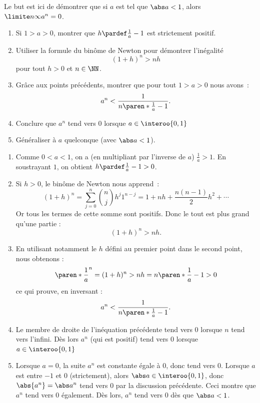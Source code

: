 \documentclass[12pt,french,oneside,a4paper]{memoir} %
\begin{document}
\begin{exo}
Le but est ici de démontrer que si $a$ est tel que $\abs a < 1$, alors $\limite n \infty a^{n} = 0$. 
\begin{enumerate}
\item Si $1 > a > 0$, montrer que $h \pardef \frac{1}{a} - 1$ est strictement positif.
\item Utiliser la formule du binôme de Newton pour démontrer l'inégalité
  \begin{equation*}
    (1+h)^{n} > nh
  \end{equation*}
  pour tout $h > 0$ et $n \in \NN$.
\item Grâce aux points précédents, montrer que pour tout $1 > a > 0$ nous avons~:
  \begin{equation*}
    a^{n} < \frac{1}{n \paren*{\frac{1}{a} - 1}}.
  \end{equation*}
\item Conclure que $a^{n}$ tend vers $0$ lorsque $a \in \interoo{0,1}$
\item Généraliser à $a$ quelconque (avec $\abs a < 1$).
\end{enumerate}
\begin{correction}
\begin{enumerate}
\item Comme $0 < a < 1$, on a (en multipliant par l'inverse de $a$) $\frac 1 a > 1$. En soustrayant $1$, on obtient $h \pardef \frac{1}{a} - 1 > 0$.
\item Si $h > 0$, le binôme de Newton nous apprend~:
  \begin{equation*}
    (1+h)^{n} = \sum_{j=0}^{n} \binom{n}{j} h^{j} 1^{n-j} = 1 + n h + \frac{n(n-1)}{2} h^{2} + \cdots
  \end{equation*}
  Or tous les termes de cette somme sont positifs. Donc le tout est plus grand qu'une partie :
  \begin{equation*}
    (1+h)^{n} > nh.
  \end{equation*}
\item En utilisant notamment le $h$ défini au premier point dans le second point, nous obtenons :
  \begin{equation*}
    {\paren*{\frac 1 a}}^{n}= (1+h)^{n} > nh = n \paren*{\frac{1}{a} - 1} > 0
  \end{equation*}
  ce qui prouve, en inversant :
  \begin{equation*}
    a^{n} < \frac{1}{n \paren*{\frac{1}{a} - 1}}.
  \end{equation*}
\item Le membre de droite de l'inéquation précédente tend vers $0$ lorsque $n$ tend vers l'infini. Dès lors $a^{n}$ (qui est positif) tend vers $0$ lorsque $a \in \interoo{0,1}$
\item Lorsque $a = 0$, la suite $a^{n}$ est constante égale à $0$, donc tend vers $0$. Lorsque $a$ est entre $-1$ et $0$ (strictement), alors $\abs a \in \interoo{0,1}$, donc $\abs {a^{n}} = \abs a^{n}$ tend vers $0$ par la discussion précédente. Ceci montre que $a^{n}$ tend vers $0$ également. Dès lors, $a^{n}$ tend vers $0$ dès que $\abs a < 1$.
\end{enumerate}
\end{correction}
\end{exo}
\end{document}
